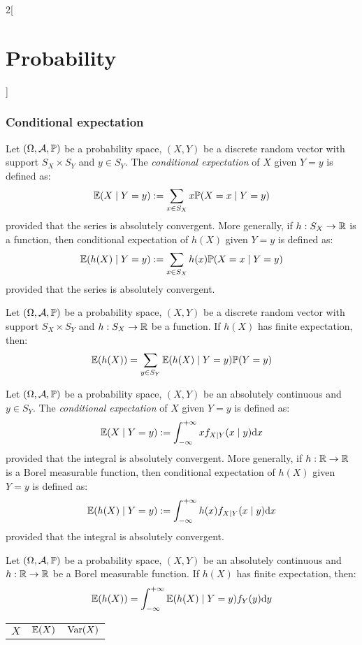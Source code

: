\documentclass[../../../main.tex]{subfiles}
\begin{document}
\begin{multicols}{2}[\section{Probability}]
    \subsubsection{Conditional expectation}
    \begin{definition}
        Let $(\Omega,\mathcal{A},\mathbb{P})$ be a probability space, $(X,Y)$ be a discrete random vector with support $S_X\times S_Y$ and $y\in S_Y$. The \textit{conditional expectation} of $X$ given $Y=y$ is defined as: $$\mathbb{E}(X\mid Y=y):=\sum_{x\in S_X}x\mathbb{P}(X=x\mid Y=y)$$ provided that the series is absolutely convergent. More generally, if $h:S_X\rightarrow\mathbb{R}$ is a function, then conditional expectation of $h(X)$ given $Y=y$ is defined as: $$\mathbb{E}(h(X)\mid Y=y):=\sum_{x\in S_X}h(x)\mathbb{P}(X=x\mid Y=y)$$ provided that the series is absolutely convergent.
    \end{definition}
    \begin{prop}
        Let $(\Omega,\mathcal{A},\mathbb{P})$ be a probability space, $(X,Y)$ be a discrete random vector with support $S_X\times S_Y$ and $h:S_X\rightarrow\mathbb{R}$ be a function. If $h(X)$ has finite expectation, then: $$\mathbb{E}(h(X))=\sum_{y\in S_Y}\mathbb{E}(h(X)\mid Y=y)\mathbb{P}(Y=y)$$
    \end{prop}
    \begin{definition}
        Let $(\Omega,\mathcal{A},\mathbb{P})$ be a probability space, $(X,Y)$ be an absolutely continuous and $y\in S_Y$. The \textit{conditional expectation} of $X$ given $Y=y$ is defined as: $$\mathbb{E}(X\mid Y=y):=\int_{-\infty}^{+\infty}xf_{X\mid Y}(x\mid y)\dd x$$ provided that the integral is absolutely convergent. More generally, if $h:\mathbb{R}\rightarrow\mathbb{R}$ is a Borel measurable function, then conditional expectation of $h(X)$ given $Y=y$ is defined as: $$\mathbb{E}(h(X)\mid Y=y):=\int_{-\infty}^{+\infty}h(x)f_{X\mid Y}(x\mid y)\dd x$$ provided that the integral is absolutely convergent.
    \end{definition}
    \begin{prop}
        Let $(\Omega,\mathcal{A},\mathbb{P})$ be a probability space, $(X,Y)$ be an absolutely continuous and $h:\mathbb{R}\rightarrow\mathbb{R}$ be a Borel measurable function. If $h(X)$ has finite expectation, then: $$\mathbb{E}(h(X))=\int_{-\infty}^{+\infty}\mathbb{E}(h(X)\mid Y=y)f_Y(y)\dd y$$
    \end{prop}
    \begin{center}
        \def\arraystretch{1.25}
        \begin{tabular}{|c|c|c|}
            \hline
            $X$                      & $\displaystyle \mathbb{E}(X)$        & $\displaystyle \operatorname{Var}(X)$                     \\

\end{tabular}
\end{center}
\end{multicols}
\end{document}
